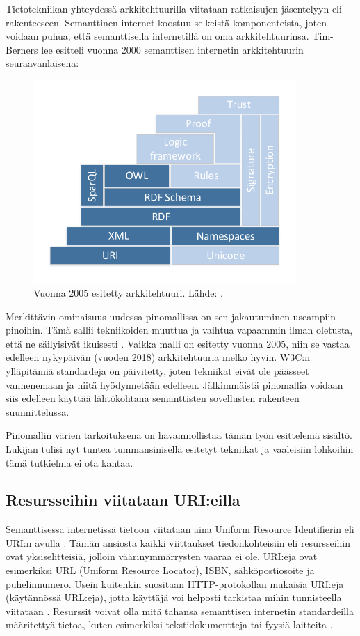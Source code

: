 \documentclass[finnish, 12pt, a4paper, elec, utf8, pdfa, online]{aaltothesis}
\begin{document}
Tietotekniikan yhteydessä arkkitehtuurilla viitataan ratkaisujen jäsentelyyn eli rakenteeseen. Semanttinen internet koostuu selkeistä komponenteista, joten voidaan puhua, että semanttisella internetillä on oma arkkitehtuurinsa. Tim-Berners lee esitteli vuonna 2000 semanttisen internetin arkkitehtuurin seuraavanlaisena:


\begin{figure}[htb]
\centering
\includegraphics[width=10cm]{images/sweb-stack2.pdf}
\caption{Vuonna 2005 esitetty arkkitehtuuri. Lähde: \cite{stack}. \label{images/sweb-stack2.pdf}}
\end{figure}

Merkittävin ominaisuus uudessa pinomallissa on sen jakautuminen useampiin pinoihin. Tämä sallii tekniikoiden muuttua ja vaihtua vapaammin ilman oletusta, että ne säilyisivät ikuisesti \cite{stack}. Vaikka malli on esitetty vuonna 2005, niin se vastaa edelleen nykypäivän (vuoden 2018) arkkitehtuuria melko hyvin. W3C:n ylläpitämiä standardeja on päivitetty, joten tekniikat eivät ole päässeet vanhenemaan ja niitä hyödynnetään edelleen. Jälkimmäistä pinomallia voidaan siis edelleen käyttää lähtökohtana semanttisten sovellusten rakenteen suunnittelussa.

Pinomallin värien tarkoituksena on havainnollistaa tämän työn esittelemä sisältö. Lukijan tulisi nyt tuntea tummansinisellä esitetyt tekniikat ja vaaleisiin lohkoihin tämä tutkielma ei ota kantaa.

\subsection{Resursseihin viitataan URI:eilla}
Semanttisessa internetissä tietoon viitataan aina Uniform Resource Identifierin eli URI:n avulla \cite{RDF_specification}. Tämän ansiosta kaikki viittaukset tiedonkohteisiin eli resursseihin ovat yksiselitteisiä, jolloin väärinymmärrysten vaaraa ei ole. URI:eja ovat esimerkiksi URL (Uniform Resource Locator), ISBN, sähköpostiosoite ja puhelinnumero. Usein kuitenkin suositaan HTTP-protokollan mukaisia URI:eja (käytännössä URL:eja), jotta käyttäjä voi helposti tarkistaa mihin tunnisteella viitataan \cite{cambridge_linked}. Resurssit voivat olla mitä tahansa semanttisen internetin standardeilla määritettyä tietoa, kuten esimerkiksi tekstidokumentteja tai fyysiä laitteita \cite{RDF_specification}.
\end{document}
